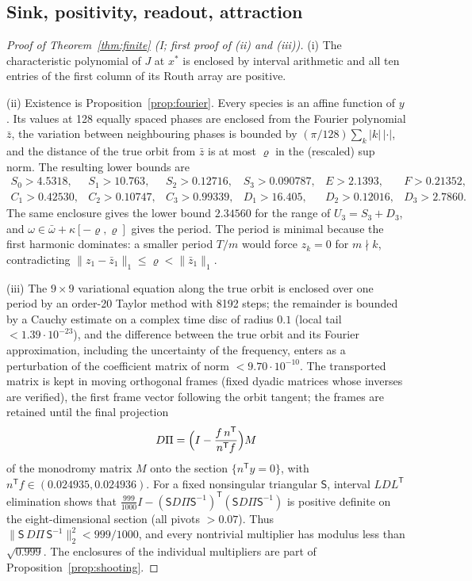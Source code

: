 \documentclass[11pt,a4paper]{article}
\theoremstyle{plain}
\theoremstyle{definition}
\theoremstyle{remark}
\newcommand{\T}{\mathsf T}
\newcommand{\norm}[1]{\lVert#1\rVert}
\newcommand{\abs}[1]{\lvert#1\rvert}
\newcommand{\evI}{\textsf{I}}
\begin{document}
\subsection{Sink, positivity, readout, attraction}
\begin{proof}[Proof of Theorem~\ref{thm:finite} \textup{(\evI; first proof of (ii) and (iii))}]
(i) The characteristic polynomial of $J$ at $x^*$ is enclosed by interval arithmetic and all ten entries of the first column of its Routh array are positive.

(ii) Existence is Proposition~\ref{prop:fourier}. Every species is an affine function of $y$. Its values at 128 equally spaced phases are enclosed from the Fourier polynomial $\bar z$, the variation between neighbouring phases is bounded by $(\pi/128)\sum_k\abs k\,\abs{\cdot}$, and the distance of the true orbit from $\bar z$ is at most $\varrho$ in the (rescaled) sup norm. The resulting lower bounds are
{\small\[
\begin{array}{llllll}
S_0>4.5318,&S_1>10.763,&S_2>0.12716,&S_3>0.090787,&E>2.1393,&F>0.21352,\\
C_1>0.42530,&C_2>0.10747,&C_3>0.99339,&D_1>16.405,&D_2>0.12016,&D_3>2.7860 .
\end{array}
\]}
The same enclosure gives the lower bound $2.34560$ for the range of $U_3=S_3+D_3$, and $\omega\in\bar\omega+\kappa[-\varrho,\varrho]$ gives the period. The period is minimal because the first harmonic dominates: a smaller period $T/m$ would force $z_k=0$ for $m\nmid k$, contradicting $\norm{z_1-\bar z_1}_1\le\varrho<\norm{\bar z_1}_1$.

(iii) The $9\times9$ variational equation along the true orbit is enclosed over one period by an order-20 Taylor method with 8192 steps; the remainder is bounded by a Cauchy estimate on a complex time disc of radius $0.1$ (local tail $<1.39\cdot10^{-23}$), and the difference between the true orbit and its Fourier approximation, including the uncertainty of the frequency, enters as a perturbation of the coefficient matrix of norm $<9.70\cdot10^{-10}$. The transported matrix is kept in moving orthogonal frames (fixed dyadic matrices whose inverses are verified), the first frame vector following the orbit tangent; the frames are retained until the final projection
\[
D\Pi=\Bigl(I-\frac{f\,n^\T}{n^\T f}\Bigr)M
\]
of the monodromy matrix $M$ onto the section $\{n^\T y=0\}$, with $n^\T f\in(0.024935,0.024936)$. For a fixed nonsingular triangular $\mathsf S$, interval $LDL^\T$ elimination shows that $\frac{999}{1000}I-(\mathsf SD\Pi\mathsf S^{-1})^\T(\mathsf SD\Pi\mathsf S^{-1})$ is positive definite on the eight-dimensional section (all pivots $>0.07$). Thus $\norm{\mathsf S\,D\Pi\,\mathsf S^{-1}}_2^2<999/1000$, and every nontrivial multiplier has modulus less than $\sqrt{0.999}$. The enclosures of the individual multipliers are part of Proposition~\ref{prop:shooting}.


\end{proof}
\end{document}

